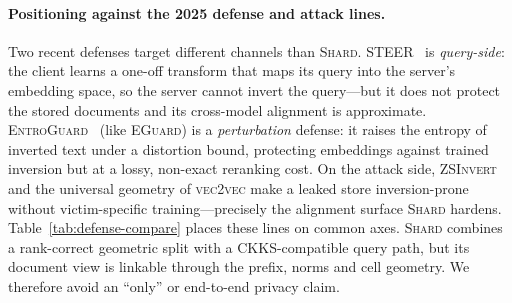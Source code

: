 \paragraph{Positioning against the 2025 defense and attack lines.} Two recent
defenses target different channels than \textsc{Shard}.
\textsc{STEER}~\cite{ref_steer} is \emph{query-side}: the client learns a
one-off transform that maps its query into the server's embedding space, so
the server cannot invert the query---but it does not protect the stored
documents and its cross-model alignment is approximate.
\textsc{EntroGuard}~\cite{ref_entroguard} (like \textsc{EGuard}) is a
\emph{perturbation} defense: it raises the entropy of inverted text under a
distortion bound, protecting embeddings against trained inversion but at a
lossy, non-exact reranking cost. On the attack side, \textsc{ZSInvert} and
the universal geometry of \textsc{vec2vec} make a leaked store
inversion-prone without victim-specific training---precisely the alignment
surface \textsc{Shard} hardens. Table~\ref{tab:defense-compare} places these
lines on common axes. \textsc{Shard} combines a rank-correct geometric split
with a CKKS-compatible query path, but its document view is linkable through
the prefix, norms and cell geometry. We therefore avoid an ``only'' or
end-to-end privacy claim.

